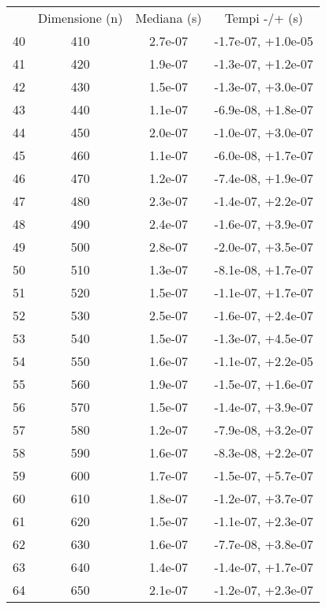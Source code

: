 \begin{table}
\centering
\begin{adjustbox}{width=1\textwidth/2}
\begin{tabular}{|c|c|c|c|}
\hline
 & Dimensione (n) & Mediana (s) & Tempi -/+ (s) \\
40 & 410 & 2.7e-07 & -1.7e-07, +1.0e-05 \\
\cline{1-4}
41 & 420 & 1.9e-07 & -1.3e-07, +1.2e-07 \\
\cline{1-4}
42 & 430 & 1.5e-07 & -1.3e-07, +3.0e-07 \\
\cline{1-4}
43 & 440 & 1.1e-07 & -6.9e-08, +1.8e-07 \\
\cline{1-4}
44 & 450 & 2.0e-07 & -1.0e-07, +3.0e-07 \\
\cline{1-4}
45 & 460 & 1.1e-07 & -6.0e-08, +1.7e-07 \\
\cline{1-4}
46 & 470 & 1.2e-07 & -7.4e-08, +1.9e-07 \\
\cline{1-4}
47 & 480 & 2.3e-07 & -1.4e-07, +2.2e-07 \\
\cline{1-4}
48 & 490 & 2.4e-07 & -1.6e-07, +3.9e-07 \\
\cline{1-4}
49 & 500 & 2.8e-07 & -2.0e-07, +3.5e-07 \\
\cline{1-4}
50 & 510 & 1.3e-07 & -8.1e-08, +1.7e-07 \\
\cline{1-4}
51 & 520 & 1.5e-07 & -1.1e-07, +1.7e-07 \\
\cline{1-4}
52 & 530 & 2.5e-07 & -1.6e-07, +2.4e-07 \\
\cline{1-4}
53 & 540 & 1.5e-07 & -1.3e-07, +4.5e-07 \\
\cline{1-4}
54 & 550 & 1.6e-07 & -1.1e-07, +2.2e-05 \\
\cline{1-4}
55 & 560 & 1.9e-07 & -1.5e-07, +1.6e-07 \\
\cline{1-4}
56 & 570 & 1.5e-07 & -1.4e-07, +3.9e-07 \\
\cline{1-4}
57 & 580 & 1.2e-07 & -7.9e-08, +3.2e-07 \\
\cline{1-4}
58 & 590 & 1.6e-07 & -8.3e-08, +2.2e-07 \\
\cline{1-4}
59 & 600 & 1.7e-07 & -1.5e-07, +5.7e-07 \\
\cline{1-4}
60 & 610 & 1.8e-07 & -1.2e-07, +3.7e-07 \\
\cline{1-4}
61 & 620 & 1.5e-07 & -1.1e-07, +2.3e-07 \\
\cline{1-4}
62 & 630 & 1.6e-07 & -7.7e-08, +3.8e-07 \\
\cline{1-4}
63 & 640 & 1.4e-07 & -1.4e-07, +1.7e-07 \\
\cline{1-4}
64 & 650 & 2.1e-07 & -1.2e-07, +2.3e-07 \\

\end{tabular}
\end{adjustbox}
\end{table}
